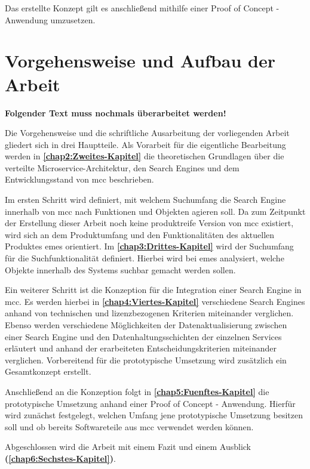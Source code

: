 Das erstellte Konzept gilt es anschließend mithilfe einer Proof of Concept - Anwendung umzusetzen.

\section{Vorgehensweise und Aufbau der Arbeit\label{sec1.3:Unterpunkt-3}}

\textbf{Folgender Text muss nochmals überarbeitet werden!}

Die Vorgehensweise und die schriftliche Ausarbeitung der vorliegenden Arbeit gliedert sich in drei Hauptteile. Als Vorarbeit für die eigentliche Bearbeitung werden in \textbf{\autoref{chap2:Zweites-Kapitel}} die theoretischen Grundlagen über die verteilte Microservice-Architektur, den Search Engines und dem Entwicklungsstand von \gls{mcc} beschrieben.

Im ersten Schritt wird definiert, mit welchem Suchumfang die Search Engine innerhalb von \gls{mcc} nach Funktionen und Objekten agieren soll. Da zum Zeitpunkt der Erstellung dieser Arbeit noch keine produktreife Version von \gls{mcc} existiert, wird sich an dem Produktumfang und den Funktionalitäten des aktuellen Produktes \gls{emes} orientiert. Im \textbf{\autoref{chap3:Drittes-Kapitel}} wird der Suchumfang für die Suchfunktionalität definiert. Hierbei wird bei \gls{emes} analysiert, welche Objekte innerhalb des Systems \glqq suchbar\grqq{} gemacht werden sollen.

Ein weiterer Schritt ist die Konzeption für die Integration einer Search Engine in \gls{mcc}. Es werden hierbei in \textbf{\autoref{chap4:Viertes-Kapitel}} verschiedene Search Engines anhand von technischen und lizenzbezogenen Kriterien miteinander verglichen. Ebenso werden verschiedene Möglichkeiten der Datenaktualisierung zwischen einer Search Engine und den Datenhaltungsschichten der einzelnen Services erläutert und anhand der erarbeiteten Entscheidungskriterien miteinander verglichen. Vorbereitend für die prototypische Umsetzung wird zusätzlich ein Gesamtkonzept erstellt.

Anschließend an die Konzeption folgt in \textbf{\autoref{chap5:Fuenftes-Kapitel}} die prototypische Umsetzung anhand einer Proof of Concept - Anwendung. Hierfür wird zunächst festgelegt, welchen Umfang jene prototypische Umsetzung besitzen soll und ob bereits Softwareteile aus \gls{mcc} verwendet werden können.

Abgeschlossen wird die Arbeit mit einem Fazit und einem Ausblick \textbf{(\autoref{chap6:Sechstes-Kapitel})}.